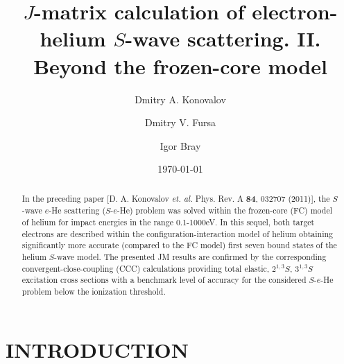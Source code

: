 \documentclass[aip
, pra
, showpacs
, aps
, twocolumn
, groupedaddress
, floatfix
]{revtex4}
\begin{document}
\title {$J$-matrix calculation of electron-helium $S$-wave scattering. II. Beyond the frozen-core model}

\author{Dmitry A. Konovalov}

\author{Dmitry V. Fursa}

\author{Igor Bray}



\date{\today}

\begin{abstract}

In the preceding paper [D. A. Konovalov {\em et. al.} Phys. Rev. A {\bf 84}, 032707 (2011)],
the $S$-wave $e$-He scattering ($S$-$e$-He) problem was solved within the frozen-core (FC) model of helium for impact energies in the range 0.1-1000eV.
In this sequel,
both target electrons are described within the configuration-interaction model of helium obtaining significantly more accurate (compared to the FC model)
first seven bound states of the helium $S$-wave model.
The presented JM results are confirmed by the corresponding convergent-close-coupling (CCC) calculations providing
total elastic, $2^{1,3}S$, $3^{1,3}S$ excitation cross sections with a benchmark level of accuracy for the considered $S$-$e$-He problem below the ionization threshold.

\end{abstract}

\maketitle



\section{INTRODUCTION}
\end{document}
